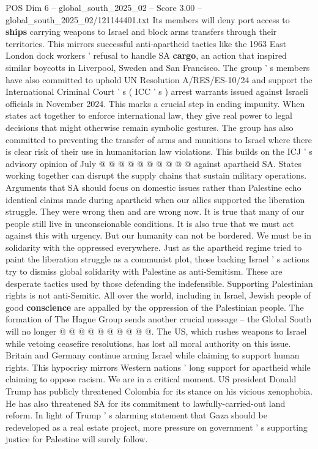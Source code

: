 \begin{textsample}{POS Dim 6 – global\_south\_2025\_02 – Score 3.00 – global\_south\_2025\_02/121144401.txt}
Its members will deny port access to \textbf{ships} carrying weapons to Israel and block arms transfers through their territories.
This mirrors successful anti-apartheid tactics like the 1963 East London dock workers ' refusal to handle SA \textbf{cargo}, an action that inspired similar boycotts in Liverpool, Sweden and San Francisco.
The group ' s members have also committed to uphold UN Resolution A/RES/ES-10/24 and support the International Criminal Court ' s ( ICC ' s ) arrest warrants issued against Israeli officials in November 2024.
This marks a crucial step in ending impunity.
When states act together to enforce international law, they give real power to legal decisions that might otherwise remain symbolic gestures.
The group has also committed to preventing the transfer of arms and munitions to Israel where there is clear risk of their use in humanitarian law violations.
This builds on the ICJ ' s advisory opinion of July @ @ @ @ @ @ @ @ @ @ against apartheid SA.
States working together can disrupt the supply chains that sustain military operations.
Arguments that SA should focus on domestic issues rather than Palestine echo identical claims made during apartheid when our allies supported the liberation struggle.
They were wrong then and are wrong now.
It is true that many of our people still live in unconscionable conditions.
It is also true that we must act against this with urgency.
But our humanity can not be bordered.
We must be in solidarity with the oppressed everywhere.
Just as the apartheid regime tried to paint the liberation struggle as a communist plot, those backing Israel ' s actions try to dismiss global solidarity with Palestine as anti-Semitism.
These are desperate tactics used by those defending the indefensible.
Supporting Palestinian rights is not anti-Semitic.
All over the world, including in Israel, Jewish people of good \textbf{conscience} are appalled by the oppression of the Palestinian people.
The formation of The Hague Group sends another crucial message -- the Global South will no longer @ @ @ @ @ @ @ @ @ @.
The US, which rushes weapons to Israel while vetoing ceasefire resolutions, has lost all moral authority on this issue.
Britain and Germany continue arming Israel while claiming to support human rights.
This hypocrisy mirrors Western nations ' long support for apartheid while claiming to oppose racism.
We are in a critical moment.
US president Donald Trump has publicly threatened Colombia for its stance on his vicious xenophobia.
He has also threatened SA for its commitment to lawfully-carried-out land reform.
In light of Trump ' s alarming statement that Gaza should be redeveloped as a real estate project, more pressure on government ' s supporting justice for Palestine will surely follow.

\end{textsample}
